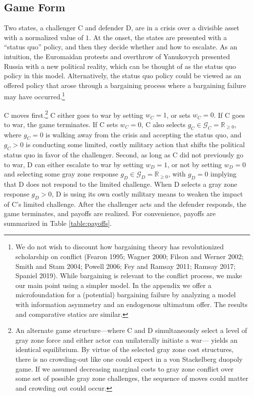\documentclass[
]{article}
\begin{document}
\hypertarget{game-form}{%
\subsection{Game Form}\label{game-form}}

Two states, a challenger C and defender D, are in a crisis over a divisible asset with a normalized value of \(1\). At the onset, the states are presented with a ``status quo'' policy, and then they decide whether and how to escalate. As an intuition, the Euromaidan protests and overthrow of Yanukovych presented Russia with a new political reality, which can be thought of as the status quo policy in this model. Alternatively, the status quo policy could be viewed as an offered policy that arose through a bargaining process where a bargaining failure may have occurred.\footnote{We do not wish to discount how bargaining theory has revolutionized scholarship on conflict (Fearon 1995; Wagner 2000; Filson and Werner 2002; Smith and Stam 2004; Powell 2006; Fey and Ramsay 2011; Ramsay 2017; Spaniel 2019). While bargaining is relevant to the conflict process, we make our main point using a simpler model. In the appendix we offer a microfoundation for a (potential) bargaining failure by analyzing a model with information asymmetry and an endogenous ultimatum offer. The results and comparative statics are similar.}

C moves first.\footnote{An alternate game structure---where C and D simultaneously select a level of gray zone force and either actor can unilaterally initiate a war--- yields an identical equilibrium. By virtue of the selected gray zone cost structures, there is no crowding-out like one could expect in a von Stackelberg duopoly game. If we assumed decreasing marginal costs to gray zone conflict over some set of possible gray zone challenges, the sequence of moves could matter and crowding out could occur.} C either goes to war by setting \(w_{C}=1\), or sets \(w_{C}=0\). If C goes to war, the game terminates. If C sets \(w_{C}=0\), C also selects \(g_{C}\in\mathcal{G}_{C}=\mathbb{R}_{\geq0}\), where \(g_{C}=0\) is walking away from the crisis and accepting the status quo, and \(g_{C}>0\) is conducting some limited, costly military action that shifts the political status quo in favor of the challenger. Second, as long as C did not previously go to war, D can either escalate to war by setting \(w_{D}=1\), or not by setting \(w_{D}=0\) and selecting some gray zone response \(g_{D}\in\mathcal{G}_{D}=\mathbb{R}_{\geq0}\), with \(g_{D}=0\) implying that D does not respond to the limited challenge. When D selects a gray zone response \(g_{D}>0\), D is using its own costly military means to weaken the impact of C's limited challenge. After the challenger acts and the defender responds, the game terminates, and payoffs are realized. For convenience, payoffs are summarized in Table \ref{table:payoffs}.
\end{document}
